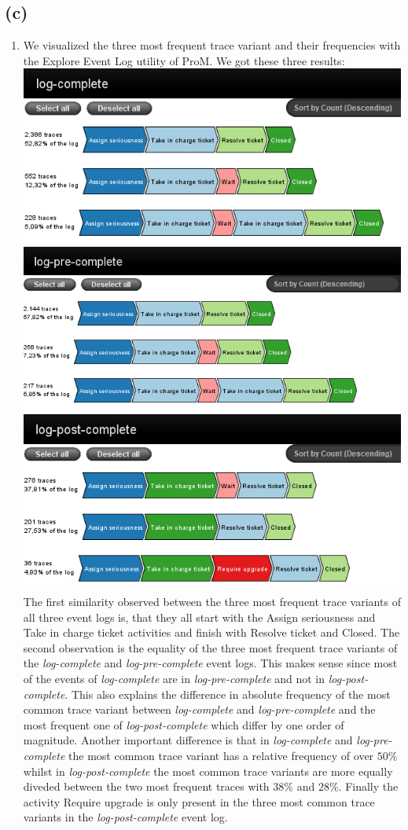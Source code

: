 \documentclass[../../main.tex]{subfiles}
\begin{document}
\subsection*{(c)}
\begin{enumerate}
\item We visualized the three most frequent trace variant and their frequencies with the Explore Event Log utility of ProM. We got these three results:\\
\includegraphics[width=0.5\columnwidth]{img/ProM_explore_log_complete.png}
\includegraphics[width=0.5\columnwidth]{img/ProM_explore_log_pre.png}
\includegraphics[width=0.5\columnwidth]{img/ProM_explore_log_post.png}\\
The first similarity observed between the three most frequent trace variants of all three event logs is, that they all start with the Assign seriousness and Take in charge ticket activities and finish with Resolve ticket and Closed. The second observation is the equality of the three most frequent trace variants of the \textit{log-complete} and \textit{log-pre-complete} event logs. This makes sense since most of the events of \textit{log-complete} are in \textit{log-pre-complete} and not in \textit{log-post-complete}. This also explains the difference in absolute frequency of the most common trace variant between \textit{log-complete} and \textit{log-pre-complete} and the most frequent one of \textit{log-post-complete} which differ by one order of magnitude. Another important difference is that in \textit{log-complete} and \textit{log-pre-complete} the most common trace variant has a relative frequency of over $50\%$ whilst in \textit{log-post-complete} the most common trace variants are more equally diveded between the two most frequent traces with $38\%$ and $28\%$. Finally the activity Require upgrade is only present in the three most common trace variants in the \textit{log-post-complete} event log.

\end{enumerate}
\end{document}
